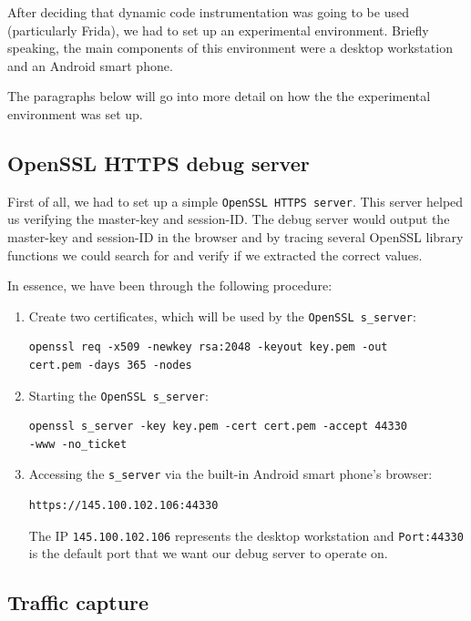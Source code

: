 \documentclass[12pt, a4paper]{report}
\begin{document}
After deciding that dynamic code instrumentation was going to be used (particularly Frida), we had to set up an experimental environment. Briefly speaking, the main components of this environment were a desktop workstation and an Android smart phone.  

The paragraphs below will go into more detail on how the the experimental environment was set up.


\subsection{OpenSSL HTTPS debug server}

First of all, we had to set up a simple \texttt{OpenSSL HTTPS server}. This server helped us verifying the master-key and session-ID. The debug server would output the master-key and session-ID in the browser and by tracing several OpenSSL library functions we could search for and verify if we extracted the correct values.

In essence, we have been through the following procedure:

\begin{enumerate}
\item Create two certificates, which will be used by the \texttt{OpenSSL s\_server}:
\begin{lstlisting}[frame=single, breaklines=true]
openssl req -x509 -newkey rsa:2048 -keyout key.pem -out
cert.pem -days 365 -nodes	
\end{lstlisting}	

\item Starting the \texttt{OpenSSL s\_server}:
\begin{lstlisting}[frame=single, breaklines=true]
openssl s_server -key key.pem -cert cert.pem -accept 44330
-www -no_ticket
\end{lstlisting}

\item Accessing the \texttt{s\_server} via the built-in Android smart phone's browser:
\begin{lstlisting}[frame=single, breaklines=true]
https://145.100.102.106:44330
\end{lstlisting}
The IP \texttt{145.100.102.106} represents the desktop workstation and \texttt{Port:44330} is the default port that we want our debug server to operate on.  

\end{enumerate}

\subsection{Traffic capture}
\end{document}
